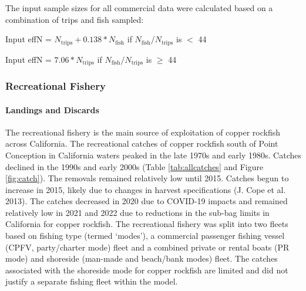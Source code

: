 \documentclass[11pt,
  english,
  letterpaper,
]{article}
\begin{document}
The input sample sizes for all commercial data were calculated based on a combination of trips and fish sampled:

\begin{centering}

Input effN = $N_{\text{trips}} + 0.138 * N_{\text{fish}}$ if $N_{\text{fish}}/N_{\text{trips}}$ is $<$ 44

Input effN = $7.06 * N_{\text{trips}}$ if $N_{\text{fish}}/N_{\text{trips}}$ is $\geq$ 44

\end{centering}

\hypertarget{recreational-fishery}{%
\subsubsection{Recreational Fishery}\label{recreational-fishery}}

\hypertarget{landings-and-discards-1}{%
\paragraph{Landings and Discards}\label{landings-and-discards-1}}

\hfill\break

The recreational fishery is the main source of exploitation of copper rockfish across California. The recreational catches of copper rockfish south of Point Conception in California waters peaked in the late 1970s and early 1980s. Catches declined in the 1990s and early 2000s (Table \ref{tab:allcatches} and Figure \ref{fig:catch}). The removals remained relatively low until 2015. Catches begun to increase in 2015, likely due to changes in harvest specifications (J. Cope et al. 2013). The catches decreased in 2020 due to COVID-19 impacts and remained relatively low in 2021 and 2022 due to reductions in the sub-bag limits in California for copper rockfish. The recreational fishery was split into two fleets based on fishing type (termed `modes'), a commercial passenger fishing vessel (CPFV, party/charter mode) fleet and a combined private or rental boats (PR mode) and shoreside (man-made and beach/bank modes) fleet. The catches associated with the shoreside mode for copper rockfish are limited and did not justify a separate fishing fleet within the model.
\end{document}
